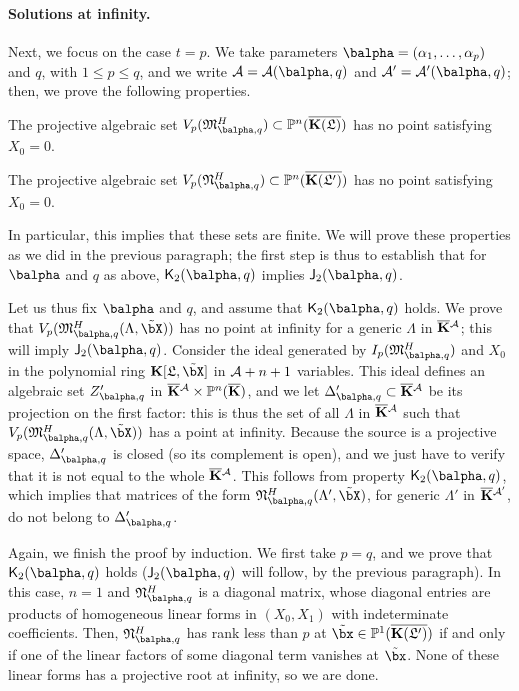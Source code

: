 \documentclass[12pt]{article}
\begin{document}
\paragraph{Solutions at infinity.} Next, we focus on the case $t=p$.
We take parameters $\balpha=(\alpha_1,\dots,\alpha_p)$ and $q$, with
$1 \le p \le q$, and we write ${\cal A}={\cal A}(\balpha,q)$ and ${\cal A}'={\cal A}'(\balpha,q)$;
then, we prove the following properties.
\begin{description}[leftmargin=*]
\item[$\assI_2(\balpha,q).$] The projective algebraic set
  $V_p(\mathfrak{M}^H_{\balpha,q}) \subset \P^n(\KKGbar)$ has no point
  satisfying $X_0=0$.
\item[$\assJ_2(\balpha,q).$] The projective algebraic set
  $V_p(\mathfrak{N}^H_{\balpha,q}) \subset \P^n(\KKGpbar)$ has no point
  satisfying $X_0=0$.
\end{description}
In particular, this implies that these sets are finite. We will prove
these properties as we did in the previous paragraph; the first step
is thus to establish that for $\balpha$ and $q$ as above,
$\assJ_2(\balpha,q)$ implies $\assI_2(\balpha,q)$.

Let us thus fix $\balpha$ and $q$, and assume that
$\assJ_2(\balpha,q)$ holds. We prove that
$V_p(\mathfrak{M}^H_{\balpha,q}(\Lambda,\tilde\bX))$ has no point at
infinity for a generic $\Lambda$ in $\overline{\mathbf{K}}{}^{\cal A}$; this will imply
$\assI_2(\balpha,q)$. Consider the ideal generated by
$I_{p}(\mathfrak{M}^H_{\balpha,q})$ and $X_0$ in the polynomial ring
$\KK[\mathfrak{L},\tilde\bX]$ in ${\cal A}+n+1$ variables. This ideal defines
an algebraic set $Z'_{\balpha,q}$ in $\overline{\mathbf{K}}{}^{\cal A} \times \mathbb{P}^n(\overline{\mathbf{K}})$,
and we let $\Delta'_{\balpha,q} \subset \KKbar{}^{\cal A}$ be its projection
on the first factor: this is thus the set of all $\Lambda$ in
$\overline{\mathbf{K}}{}^{\cal A}$ such that
$V_p(\mathfrak{M}^H_{\balpha,q}(\Lambda,\tilde\bX))$ has a point at
infinity. Because the source is a projective space, $\Delta'_{\balpha,q}$ is
closed (so its complement is open), and we just have to verify that it
is not equal to the whole $\overline{\mathbf{K}}{}^{\cal A}$. This follows from property
$\assJ_2(\balpha,q)$, which implies that matrices of the form
$\mathfrak{N}^H_{\balpha,q}(\Lambda',\tilde\bX)$, for generic
$\Lambda'$ in $\overline{\mathbf{K}}{}^{{\cal A}'}$, do not belong to $\Delta'_{\balpha,q}$.

Again, we finish the proof by induction. We first take $p=q$, and we
prove that $\assJ_2(\balpha,q)$ holds ($\assI_2(\balpha,q)$ will follow,
by the previous paragraph). In this case, $n=1$ and
$\mathfrak{N}^H_{\balpha,q}$ is a diagonal matrix, whose diagonal entries
are products of homogeneous linear forms in $(X_0,X_1)$ with indeterminate
coefficients. Then, $\mathfrak{N}^H_{\balpha,q}$ has rank less than $p$ at
$\tilde\bx\in\P^1(\KKGpbar)$ if and only if one of the linear factors
of some diagonal term vanishes at $\tilde \bx$. None of these linear
forms has a projective root at infinity, so we are done.
\end{document}
